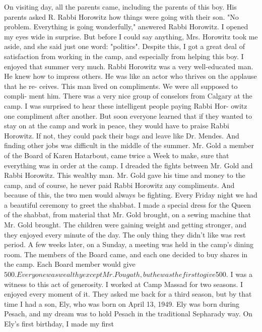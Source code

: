  
On visiting day, all the parents came, including the parents of 
this boy. His parents asked R. Rabbi Horowitz how things were going with their son. 
"No problem. Everything is going wonderfully," answered Rabbi Horowitz. I opened my eyes wide in surprise. But before I could say anything, Mrs. Horowitz took me aside, and she said just one word: "politics". 
Despite this, I got a great deal of satisfaction from working in 
the camp, and especially from helping this boy. I enjoyed that summer 
very much. 
Rabbi Horowitz was a very well-educated man. He knew how to impress 
others. He was like an actor who thrives on the applause that he re-
ceives. This man lived on compliments. We were all supposed to compli-
ment him. 
There was a very nice group of conselors from Calgary at the camp. 
I was surprised to hear these intelligent people paying Rabbi Hor-
owitz one compliment after another. But soon everyone learned that if 
they wanted to stay on at the camp and work in peace, they would have to 
praise Rabbi Horowitz. If not, they could pack their bags and leave like 
Dr. Mendes. And finding other jobs was difficult in the middle of the 
summer. 
Mr. Gold a member of the Board of Karen Hatarbout, came twice a 
Week to make, sure that everything was in order at the camp. I dreaded 
the fights between Mr. Gold and Rabbi Horowitz. This wealthy man. Mr. 
Gold gave his time and money to the camp, and of course, he never 
paid Rabbi Horowitz any compliments. And because of this, the two men 
would always be fighting. 
Every Friday night we had a beautiful ceremony to greet the shabbat. 
I made a special dress for the Queen of the shabbat, from material that 
Mr. Gold brought, on a sewing machine that Mr. Gold brought. The children were gaining weight and getting stronger, and they enjoyed every minute of the day. The only thing they didn't like was rest period. 
A few weeks later, on a Sunday, a meeting was held in the camp's 
dining room. The members of the Board came, and each one decided to 
buy shares in the camp. Each Board member would give $500. Everyone 
was wealthy except Mr. Pougath, but he was the first to give $500. I 
was a witness to this act of generosity. 
I worked at Camp Massad for two seasons. I enjoyed every moment 
of it. They asked me back for a third season, but by that time I had 
a son, Ely, who was born on April 13, 1949. 
Ely was born during Pesach, and my dream was to hold Pesach in the 
traditional Sepharady way. On Ely's first birthday, I made my first 

